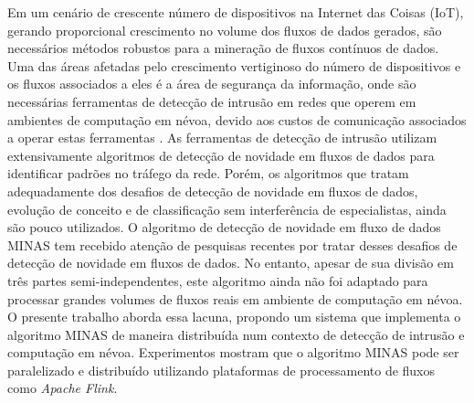 \begin{resumo}

    Em um cenário de crescente número de dispositivos na Internet das Coisas
    (IoT), gerando proporcional crescimento no volume dos fluxos de dados
    gerados, são necessários métodos robustos para a mineração de fluxos
    contínuos de dados.
    Uma das áreas afetadas pelo crescimento vertiginoso do número de
    dispositivos e os fluxos associados a eles é a área de segurança da
    informação, onde são necessárias ferramentas de detecção de intrusão em
    redes que operem em ambientes de computação em névoa, devido aos custos de
    comunicação associados a operar estas ferramentas 
    .
    As ferramentas de detecção de intrusão utilizam extensivamente algoritmos de
    detecção de novidade em fluxos de dados para identificar padrões no tráfego
    da rede.
    Porém, os algoritmos que tratam adequadamente dos desafios de detecção de
    novidade em fluxos de dados,  evolução de conceito e
     de classificação sem interferência de
    especialistas, ainda são pouco utilizados.
    O algoritmo de detecção de novidade em fluxo de dados MINAS tem recebido
    atenção de pesquisas recentes por tratar desses desafios de detecção de novidade
    em fluxos de dados.
    No entanto, apesar de sua divisão em três partes semi-independentes, este
    algoritmo ainda não foi adaptado para processar grandes volumes de fluxos
    reais em ambiente de computação em névoa.
    O presente trabalho aborda essa lacuna, propondo um sistema
    que implementa o algoritmo MINAS de maneira distribuída num contexto
    de detecção de intrusão e computação em névoa.
    Experimentos mostram que o algoritmo MINAS pode ser paralelizado e
    distribuído utilizando plataformas de processamento de fluxos como
    \emph{Apache Flink}.


\end{resumo}

